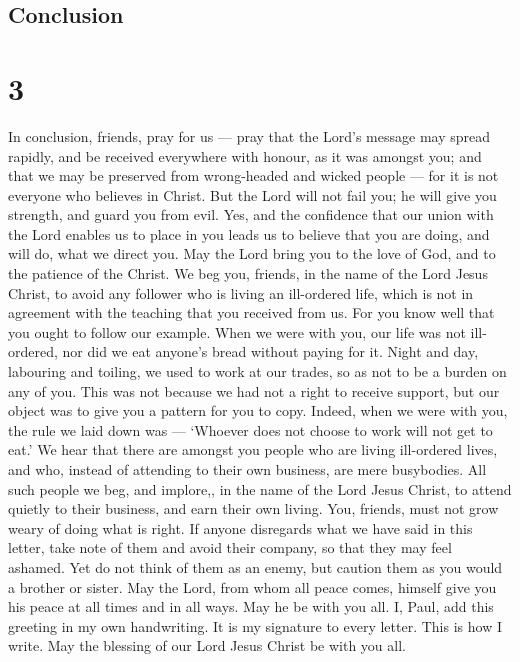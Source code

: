 \hypertarget{conclusion}{%
\subsection{Conclusion}\label{conclusion}}

\hypertarget{section-2}{%
\section{3}\label{section-2}}

 In conclusion, friends, pray for us --- pray that the
Lord's message may spread rapidly, and be received everywhere with
honour, as it was amongst you;  and that we may be preserved
from wrong-headed and wicked people --- for it is not everyone who
believes in Christ.  But the Lord will not fail you; he will
give you strength, and guard you from evil.  Yes, and the
confidence that our union with the Lord enables us to place in you leads
us to believe that you are doing, and will do, what we direct you.
 May the Lord bring you to the love of God, and to the
patience of the Christ.  We beg you, friends, in the name of
the Lord Jesus Christ, to avoid any follower who is living an
ill-ordered life, which is not in agreement with the teaching that you
received from us.  For you know well that you ought to
follow our example. When we were with you, our life was not ill-ordered,
 nor did we eat anyone's bread without paying for it. Night
and day, labouring and toiling, we used to work at our trades, so as not
to be a burden on any of you.  This was not because we had
not a right to receive support, but our object was to give you a pattern
for you to copy.  Indeed, when we were with you, the rule
we laid down was --- `Whoever does not choose to work will not get to
eat.'  We hear that there are amongst you people who are
living ill-ordered lives, and who, instead of attending to their own
business, are mere busybodies.  All such people we beg, and
implore,, in the name of the Lord Jesus Christ, to attend quietly to
their business, and earn their own living.  You, friends,
must not grow weary of doing what is right.  If anyone
disregards what we have said in this letter, take note of them and avoid
their company, so that they may feel ashamed.  Yet do not
think of them as an enemy, but caution them as you would a brother or
sister.  May the Lord, from whom all peace comes, himself
give you his peace at all times and in all ways. May he be with you all.
 I, Paul, add this greeting in my own handwriting. It is my
signature to every letter. This is how I write.  May the
blessing of our Lord Jesus Christ be with you all.
